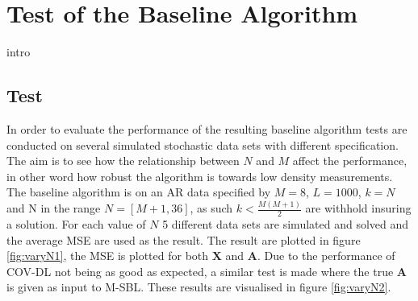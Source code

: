 \section{Test of the Baseline Algorithm}\label{sec:test_base}
intro
 
  

\subsection{Test}
In order to evaluate the performance of the resulting baseline algorithm tests are conducted on several simulated stochastic data sets with different specification. The aim is to see how the relationship between $N$ and $M$ affect the performance, in other word how robust the algorithm is towards low density measurements. 
The baseline algorithm is on an AR data specified by $M=8$, $L=1000$, $k=N$ and N in the range $N = [M+1, 36]$, as such $k<\frac{M(M+1)}{2}$ are withhold insuring a solution.
For each value of $N$ 5 different data sets are simulated and solved and the average MSE are used as the result. The result are plotted in figure \ref{fig:varyN1}, the MSE is plotted for both $\textbf{X}$ and $\textbf{A}$. 
Due to the performance of COV-DL not being as good as expected, a similar test is made where the true $\textbf{A}$ is given as input to M-SBL. These results are visualised in figure \ref{fig:varyN2}.    
      
